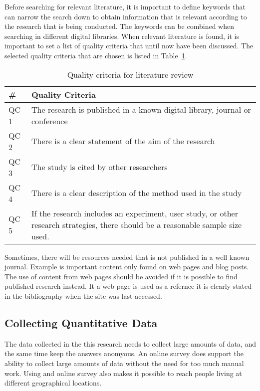 	    Before searching for relevant literature, it is important to define keywords that can narrow the search down to obtain information that is relevant according to the research that is being conducted. The keywords can be combined when searching in different digital libraries. When relevant literature is found, it is important to set a list of quality criteria that until now have been discussed.
	    The selected quality criteria that are chosen is listed in Table~\ref{tab:QualityCriteria}.

	      \begin{table}[H]
	        \centering
	        \begin{tabular}{| l | p{10cm} |}
	          \hline
	          {\bf \#} & {\bf Quality Criteria} \\ \hline
	          QC 1 & The research is published in a known digital library, journal or conference\\ \hline
	          QC 2 & There is a clear statement of the aim of the research\\ \hline
	          QC 3 & The study is cited by other researchers\\ \hline
	          QC 4 & There is a clear description of the method used in the study\\ \hline
	          QC 5 & If the research includes an experiment, user study, or other research strategies, there should be a reasonable sample size used. \\ \hline
	        \end{tabular}
	        \caption{Quality criteria for literature review}
	        \label{tab:QualityCriteria}
	      \end{table}

	    Sometimes, there will be resources needed that is not published in a well known journal. Example is important content only found on web pages and blog posts. The use of content from web pages should be avoided if it is possible to find published research instead. It a web page is used as a refernce it is clearly stated in the bibliography when the site was last accessed. 


		\subsection{Collecting Quantitative Data}

			The data collected in the this research needs to collect large amounts of data, and the same time keep the answers anomyous. An online survey does support the ability to collect large amounts of data without the need for too much manual work. Using and online survey also makes it possible to reach people living at different geographical locations.

